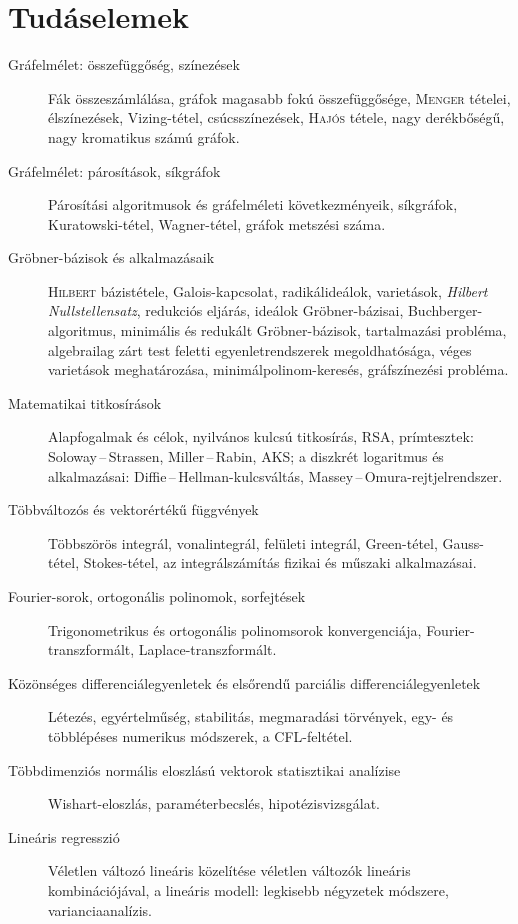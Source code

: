 \documentclass[%
	DIV=15,appendixprefix]{scrreprt}
\theoremstyle{definition}
\theoremstyle{remark}
\begin{document}
\chapter{Tudáselemek}
%
\begin{description}
	\item[Gráfelmélet: összefüggőség, színezések] Fák összeszámlálása, gráfok magasabb fokú
	összefüggősége, \textsc{Menger} tételei, élszínezések, Vizing-tétel, csúcsszínezések,
	\textsc{Hajós} tétele, nagy derékbőségű, nagy kromatikus számú gráfok.
%
	\item[Gráfelmélet: párosítások, síkgráfok] Párosítási algoritmusok és gráfelméleti
	következményeik, síkgráfok, Kuratowski-tétel, Wagner-tétel, gráfok metszési száma.
%
	\item[Gröbner-bázisok és alkalmazásaik] \textsc{Hilbert} bázistétele, Galois-kapcsolat,
	radikálideálok, varietások, \emph{Hilbert Nullstellensatz}, redukciós eljárás, ideálok
	Gröbner-bázisai, Buchberger-algoritmus, minimális és redukált Gröbner-bázisok, tartalmazási
	probléma, algebrailag zárt test feletti egyenletrendszerek megoldhatósága, véges varietások
	meghatározása, minimálpolinom-keresés, gráfszínezési probléma.
%
	\item[Matematikai titkosírások] Alapfogalmak és célok, nyilvános kulcsú titkosírás, RSA,
	prímtesztek: Soloway\,--\,Strassen, Miller\,--\,Rabin, AKS; a diszkrét logaritmus és
	alkalmazásai: Diffie\,--\,Hellman-kulcsváltás, Massey\,--\,Omura-rejtjelrendszer.
%
	\item[Többváltozós és vektorértékű függvények] Többszörös integrál, vonalintegrál, felületi
	integrál, Green-tétel, Gauss-tétel, Stokes-tétel, az integrálszámítás fizikai és műszaki
	alkalmazásai.
%
	\item[Fourier-sorok, ortogonális polinomok, sorfejtések] Trigonometrikus és ortogonális
	polinomsorok konvergenciája, Fourier-transzformált, Laplace-transzformált.
%
	\item[Közönséges differenciálegyenletek és elsőrendű parciális differenciálegyenletek] Létezés,
	egyértelműség, stabilitás, megmaradási törvények, egy- és többlépéses numerikus módszerek, a
	CFL-feltétel.
%
	\item[Többdimenziós normális eloszlású vektorok statisztikai analízise] Wishart-eloszlás,
	pa\-ra\-mé\-ter\-becs\-lés, hipotézisvizsgálat.
%
	\item[Lineáris regresszió] Véletlen változó lineáris közelítése véletlen változók lineáris
	kombinációjával, a lineáris modell: legkisebb négyzetek módszere, varianciaanalízis.

\end{description}
\end{document}
